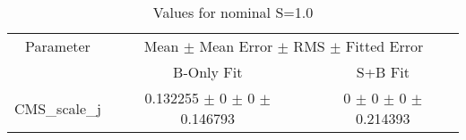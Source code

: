 \begin{table}
\centering
\caption{Values for nominal S=1.0}
\begin{tabular}{ccc}
\toprule
Parameter 	& \multicolumn{2}{c}{Mean $\pm$ Mean Error $\pm$ RMS $\pm$ Fitted Error}\\
 	& B-Only Fit & S+B Fit\\
\midrule
CMS\_scale\_j 	& \num{0.132255} $\pm$ \num{0} $\pm$ \num{0} $\pm$ \num{0.146793} 	& \num{0} $\pm$ \num{0} $\pm$ \num{0} $\pm$ \num{0.214393}\\
\bottomrule
\end{tabular}
\end{table}